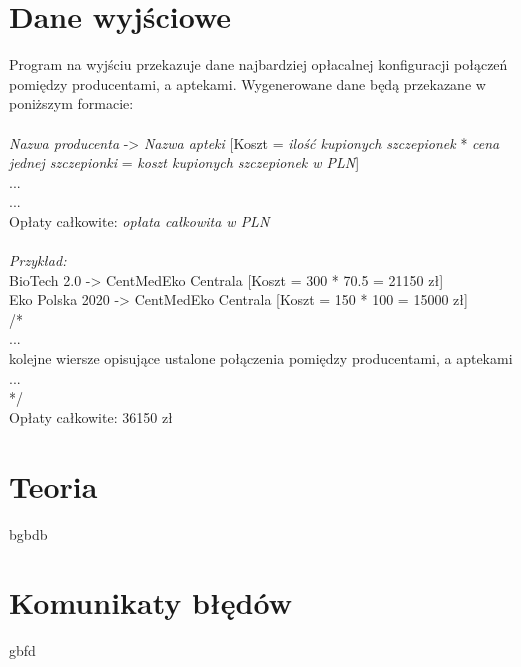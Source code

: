 \documentclass[]{article}
\begin{document}
\section{Dane wyjściowe}
Program na wyjściu przekazuje dane najbardziej opłacalnej konfiguracji połączeń pomiędzy producentami,
a aptekami. Wygenerowane dane będą przekazane w poniższym formacie:\\\\
\textit{Nazwa producenta} -> \textit{Nazwa apteki} [Koszt = \textit{ilość kupionych szczepionek} * \textit{cena jednej szczepionki} = \textit{koszt kupionych szczepionek w PLN}]\\
...\\
...\\
Opłaty całkowite: \textit{opłata całkowita w PLN}\\\\
\emph{Przykład:}\\
BioTech 2.0\hspace{7mm} -> CentMedEko Centrala [Koszt = 300 * 70.5 = 21150 zł]\\
Eko Polska 2020  -> CentMedEko Centrala [Koszt = 150 * 100 = 15000 zł]\\
/*\\
...\\
kolejne wiersze opisujące ustalone połączenia pomiędzy producentami, a aptekami\\
...\\
*/\\
Opłaty całkowite: 36150 zł\\

\section{Teoria}
bgbdb



\section{Komunikaty błędów}
gbfd
\end{document}
